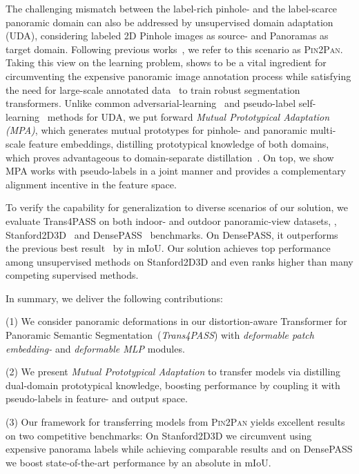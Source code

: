 \documentclass[final]{cvpr}
\begin{document}
The challenging mismatch between the label-rich pinhole- and the label-scarce panoramic domain can also be addressed by unsupervised domain adaptation (UDA), considering labeled 2D Pinhole images as source- and  Panoramas as target domain.
Following previous works~\cite{densepass,omnirange}, we refer to this scenario as \textsc{Pin2Pan}.
Taking this view on the learning problem, shows to be a vital ingredient for circumventing the expensive panoramic image annotation process while satisfying the need for large-scale annotated data~\cite{setr} to train robust segmentation transformers.
Unlike common adversarial-learning~\cite{clan} and pseudo-label self-learning~\cite{crst} methods for UDA, we put forward \emph{Mutual Prototypical Adaptation (MPA)}, which generates mutual prototypes for pinhole- and panoramic multi-scale feature embeddings, distilling prototypical knowledge of both domains, which proves advantageous to domain-separate distillation~\cite{yue2021pcs}. On top, we show MPA works with pseudo-labels in a joint manner and provides a complementary alignment incentive in the feature space.

To verify the capability for generalization to diverse scenarios of our solution, we evaluate Trans4PASS on both indoor- and outdoor panoramic-view datasets, \ie, Stanford2D3D~\cite{stanford2d3d} and DensePASS~\cite{densepass} benchmarks.
On DensePASS, it outperforms the previous best result~\cite{p2pda_trans} by  in mIoU. Our solution achieves top performance among unsupervised methods on Stanford2D3D and even ranks higher than many competing supervised methods.

In summary, we deliver the following contributions:
\begin{compactitem}
\item[(1)] We consider panoramic deformations in our distortion-aware Transformer for Panoramic Semantic Segmentation~(\emph{Trans4PASS}) with \emph{deformable patch embedding-} and \emph{deformable MLP} modules.
\item[(2)] We present \emph{Mutual Prototypical Adaptation} to transfer models via distilling dual-domain prototypical knowledge, boosting performance by coupling it with pseudo-labels in feature- and output space. 
\item[(3)] Our framework for transferring models from \textsc{Pin2Pan} yields excellent results on two competitive benchmarks: On Stanford2D3D we circumvent using  expensive panorama labels while achieving comparable results and on DensePASS we boost state-of-the-art performance by an absolute  in mIoU.
\end{compactitem}
\end{document}
